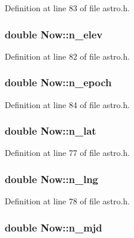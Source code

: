 Definition at line 83 of file astro.\-h.

\hypertarget{struct_now_a9254b6d4060e2fdb3e396e6db10140ac}{
\subsubsection[{n\-\_\-elev}]{\setlength{\rightskip}{0pt plus 5cm}double Now\-::n\-\_\-elev}}\label{struct_now_a9254b6d4060e2fdb3e396e6db10140ac}


Definition at line 82 of file astro.\-h.

\hypertarget{struct_now_add842a99c3f0bc6c8ef59270715cbbfd}{
\subsubsection[{n\-\_\-epoch}]{\setlength{\rightskip}{0pt plus 5cm}double Now\-::n\-\_\-epoch}}\label{struct_now_add842a99c3f0bc6c8ef59270715cbbfd}


Definition at line 84 of file astro.\-h.

\hypertarget{struct_now_aa5502c245b6c3692923dcd93d63dcda7}{
\subsubsection[{n\-\_\-lat}]{\setlength{\rightskip}{0pt plus 5cm}double Now\-::n\-\_\-lat}}\label{struct_now_aa5502c245b6c3692923dcd93d63dcda7}


Definition at line 77 of file astro.\-h.

\hypertarget{struct_now_ae87a9736998420f40706b01a26f057aa}{
\subsubsection[{n\-\_\-lng}]{\setlength{\rightskip}{0pt plus 5cm}double Now\-::n\-\_\-lng}}\label{struct_now_ae87a9736998420f40706b01a26f057aa}


Definition at line 78 of file astro.\-h.

\hypertarget{struct_now_ae44989148c84e000810e7e8a4ef80ef3}{
\subsubsection[{n\-\_\-mjd}]{\setlength{\rightskip}{0pt plus 5cm}double Now\-::n\-\_\-mjd}}\label{struct_now_ae44989148c84e000810e7e8a4ef80ef3}


